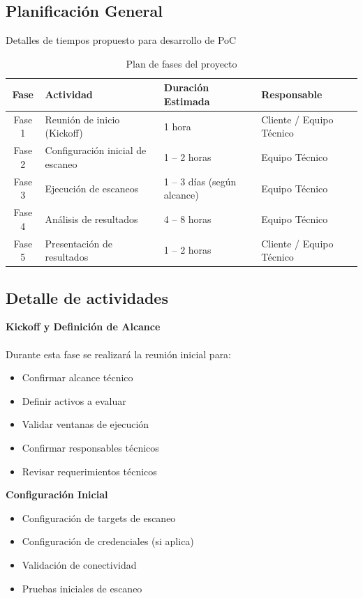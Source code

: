 \documentclass[a4paper]{article}
\begin{document}
    \subsection{Planificación General}
    Detalles de tiempos propuesto para desarrollo de PoC

    \begin{table}[h]
        \centering
        \begin{tabularx}{\textwidth}{c X X X}
        \toprule
        \textbf{Fase} & \textbf{Actividad} & \textbf{Duración Estimada} & \textbf{Responsable} \\
        \midrule
        Fase 1 & Reunión de inicio (Kickoff) & 1 hora & Cliente / Equipo Técnico \\
        Fase 2 & Configuración inicial de escaneo & 1 -- 2 horas & Equipo Técnico \\
        Fase 3 & Ejecución de escaneos & 1 -- 3 días (según alcance) & Equipo Técnico \\
        Fase 4 & Análisis de resultados & 4 -- 8 horas & Equipo Técnico \\
        Fase 5 & Presentación de resultados & 1 -- 2 horas & Cliente / Equipo Técnico \\
        \bottomrule
        \end{tabularx}
        \caption{Plan de fases del proyecto}
    \end{table}

    \subsection{Detalle de actividades}

    \textbf{Kickoff y Definición de Alcance}\\\\
    Durante esta fase se realizará la reunión inicial para:

    \begin{itemize}
        \item Confirmar alcance técnico
        \item Definir activos a evaluar
        \item Validar ventanas de ejecución
        \item Confirmar responsables técnicos
        \item Revisar requerimientos técnicos
    \end{itemize}

    \textbf{Configuración Inicial}\\
    \begin{itemize}
        \item Configuración de targets de escaneo
        \item Configuración de credenciales (si aplica)
        \item Validación de conectividad
        \item Pruebas iniciales de escaneo
    \end{itemize}
\end{document}
